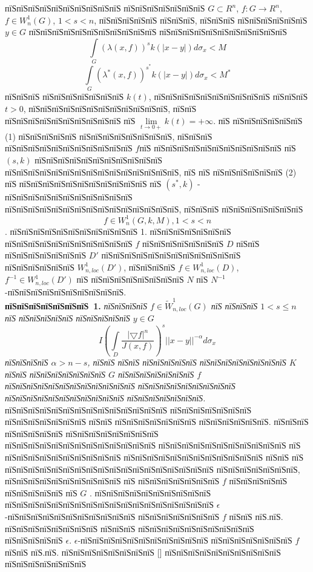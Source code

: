 \documentclass[a5paper, 12pt, openbib]{report}
\begin{document}
пїЅпїЅпїЅпїЅпїЅпїЅпїЅпїЅпїЅпїЅ  пїЅпїЅпїЅпїЅпїЅпїЅпїЅ $G\subset R^n$, $f:G\to R^n$, $f\in W^{1}_{n}(G)$, $1<s<n$, пїЅпїЅпїЅпїЅпїЅ пїЅпїЅпїЅ, пїЅпїЅпїЅ пїЅпїЅпїЅпїЅпїЅпїЅ $y\in G$ пїЅпїЅпїЅпїЅпїЅпїЅпїЅпїЅпїЅпїЅпїЅ пїЅпїЅпїЅпїЅпїЅпїЅпїЅпїЅпїЅпїЅпїЅ
\begin{equation}
\int\limits_{G}(\lambda(x,f))^{s}k(|x-y|)d\sigma_{x}<M
\end{equation} 
\begin{equation}
\int\limits_{G}(\lambda^{*}(x,f))^{s^{*}}k(|x-y|)d\sigma_{x}<M^{*}
\end{equation} 
пїЅпїЅпїЅ пїЅпїЅпїЅпїЅпїЅпїЅпїЅ $k(t)$, пїЅпїЅпїЅпїЅпїЅпїЅпїЅпїЅпїЅпїЅ пїЅпїЅпїЅ $t>0$, пїЅпїЅпїЅпїЅпїЅпїЅпїЅпїЅпїЅпїЅпїЅпїЅ, пїЅпїЅ пїЅпїЅпїЅпїЅпїЅпїЅпїЅпїЅпїЅпїЅ пїЅ $\lim\limits_{t\to 0+}k(t)=+\infty$. пїЅ  пїЅпїЅпїЅпїЅпїЅпїЅ (1) пїЅпїЅпїЅпїЅпїЅ пїЅпїЅпїЅпїЅпїЅпїЅпїЅпїЅ, пїЅпїЅпїЅ пїЅпїЅпїЅпїЅпїЅпїЅпїЅпїЅпїЅпїЅпїЅ $f$пїЅ пїЅпїЅпїЅпїЅпїЅпїЅпїЅпїЅпїЅпїЅпїЅ пїЅ $(s,k)$ пїЅпїЅпїЅпїЅпїЅпїЅпїЅпїЅпїЅпїЅпїЅ пїЅпїЅпїЅпїЅпїЅпїЅпїЅпїЅпїЅпїЅпїЅпїЅпїЅпїЅпїЅ, пїЅ пїЅ пїЅпїЅпїЅпїЅпїЅпїЅ (2) пїЅ пїЅпїЅпїЅпїЅпїЅпїЅпїЅпїЅпїЅпїЅпїЅ пїЅ $(s^{*},k)$ - пїЅпїЅпїЅпїЅпїЅпїЅпїЅпїЅпїЅпїЅпїЅ пїЅпїЅпїЅпїЅпїЅпїЅпїЅпїЅпїЅпїЅпїЅпїЅпїЅпїЅпїЅ, пїЅпїЅпїЅ пїЅпїЅпїЅпїЅпїЅпїЅпїЅ $$f\in W^{1}_{n}(G,k,M), 1<s<n$$.
пїЅпїЅпїЅпїЅпїЅпїЅпїЅпїЅпїЅпїЅпїЅ 1.  пїЅпїЅпїЅпїЅпїЅпїЅпїЅ пїЅпїЅпїЅпїЅпїЅпїЅпїЅпїЅпїЅпїЅпїЅ $f$ пїЅпїЅпїЅпїЅпїЅпїЅпїЅ $D$ пїЅпїЅ пїЅпїЅпїЅпїЅпїЅпїЅпїЅ $D'$ пїЅпїЅпїЅпїЅпїЅпїЅпїЅпїЅпїЅпїЅпїЅпїЅ пїЅпїЅпїЅпїЅпїЅпїЅ $W^{1}_{n,loc}(D')$, пїЅпїЅпїЅпїЅ $f \in W^{1}_{n,loc}(D)$, $f^{-1} \in W^{1}_{n,loc}(D')$   пїЅ пїЅпїЅпїЅпїЅпїЅпїЅпїЅпїЅ $N$ пїЅ $N^{-1}$-пїЅпїЅпїЅпїЅпїЅпїЅпїЅпїЅпїЅпїЅ.\\
\textbf{пїЅпїЅпїЅпїЅпїЅпїЅпїЅ~1.} {\it пїЅпїЅпїЅпїЅ $f\in\widetilde{W}_{n,loc}^1(G) $ пїЅ пїЅпїЅпїЅ $1<s\leq n$ пїЅ пїЅпїЅпїЅпїЅпїЅ пїЅпїЅпїЅпїЅпїЅ $y\in G$ 
\begin{equation}
I\left(
\int\limits_D\frac{|\bigtriangledown f|^{n}}{J(x,f)}
\right)^{s}||x-y||^{-\alpha}d\sigma_{x}
\end{equation}
пїЅпїЅпїЅпїЅ $\alpha>n-s$, пїЅпїЅ пїЅпїЅ пїЅпїЅпїЅпїЅпїЅ пїЅпїЅпїЅпїЅпїЅпїЅпїЅпїЅ $K$ пїЅпїЅ пїЅпїЅпїЅпїЅпїЅпїЅпїЅ $G$ пїЅпїЅпїЅпїЅпїЅпїЅпїЅ  $f$ пїЅпїЅпїЅпїЅпїЅпїЅпїЅпїЅпїЅпїЅпїЅпїЅ пїЅпїЅпїЅпїЅпїЅпїЅпїЅпїЅпїЅ пїЅпїЅпїЅпїЅпїЅпїЅпїЅпїЅпїЅпїЅпїЅ пїЅпїЅпїЅпїЅпїЅпїЅпїЅ.} пїЅпїЅпїЅпїЅпїЅпїЅпїЅпїЅпїЅпїЅпїЅпїЅпїЅпїЅ пїЅпїЅпїЅпїЅпїЅпїЅпїЅ пїЅпїЅпїЅпїЅпїЅпїЅпїЅ пїЅпїЅ пїЅпїЅпїЅпїЅпїЅпїЅпїЅ пїЅпїЅпїЅпїЅпїЅпїЅ. пїЅпїЅпїЅ пїЅпїЅпїЅпїЅпїЅ пїЅпїЅпїЅпїЅпїЅпїЅпїЅпїЅ пїЅпїЅпїЅпїЅпїЅпїЅпїЅпїЅпїЅпїЅпїЅпїЅпїЅ пїЅпїЅпїЅпїЅпїЅпїЅпїЅпїЅпїЅпїЅпїЅ пїЅ пїЅпїЅпїЅпїЅпїЅпїЅпїЅпїЅпїЅпїЅ пїЅпїЅпїЅпїЅпїЅпїЅпїЅпїЅпїЅпїЅпїЅпїЅ пїЅпїЅ $пїЅ$ пїЅпїЅпїЅпїЅпїЅпїЅпїЅпїЅпїЅпїЅпїЅпїЅпїЅпїЅпїЅпїЅпїЅпїЅ пїЅпїЅпїЅпїЅпїЅпїЅпїЅ, пїЅпїЅпїЅпїЅпїЅпїЅпїЅпїЅпїЅпїЅ пїЅ пїЅпїЅпїЅпїЅпїЅпїЅпїЅ $f$  пїЅпїЅпїЅпїЅпїЅ пїЅпїЅпїЅпїЅпїЅ пїЅ $G$ . пїЅпїЅпїЅпїЅпїЅпїЅпїЅпїЅпїЅпїЅ пїЅпїЅпїЅпїЅпїЅпїЅпїЅпїЅпїЅпїЅпїЅпїЅпїЅпїЅпїЅпїЅпїЅпїЅ $\epsilon$-пїЅпїЅпїЅпїЅпїЅпїЅпїЅпїЅпїЅпїЅпїЅ пїЅпїЅпїЅпїЅпїЅпїЅпїЅ $f$  пїЅпїЅ пїЅ.пїЅ. пїЅпїЅпїЅпїЅпїЅпїЅпїЅпїЅ пїЅпїЅпїЅ пїЅпїЅпїЅпїЅпїЅпїЅпїЅпїЅпїЅпїЅ пїЅпїЅпїЅпїЅпїЅ $\epsilon$. $\epsilon$-пїЅпїЅпїЅпїЅпїЅпїЅпїЅпїЅпїЅпїЅпїЅ пїЅпїЅпїЅпїЅпїЅпїЅпїЅ $f$ пїЅпїЅ пїЅ.пїЅ. пїЅпїЅпїЅпїЅпїЅпїЅпїЅпїЅ [] пїЅпїЅпїЅпїЅпїЅпїЅпїЅпїЅпїЅпїЅ пїЅпїЅпїЅпїЅпїЅпїЅпїЅ 
\end{document}
